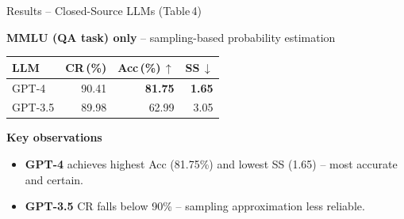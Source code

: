 \documentclass{beamer}
\newcommand{\hrow}{\rowcolor{hlblue}}
\begin{document}
\begin{frame}{Results -- Closed-Source LLMs (Table\,4)}

\begin{block}{\textbf{MMLU (QA task) only} \small-- sampling-based probability estimation}
\small
\renewcommand{\arraystretch}{1.4}
\begin{center}
\begin{tabular}{lrrr}
\toprule
\textbf{LLM} & \textbf{CR\,(\%)} & \textbf{Acc\,(\%)\,$\uparrow$} & \textbf{SS\,$\downarrow$} \\
\midrule
\hrow GPT-4              & 90.41 & \textbf{81.75} & \textbf{1.65} \\
GPT-3.5                  & 89.98 & 62.99 & 3.05 \\
\bottomrule
\end{tabular}
\end{center}
\end{block}

\medskip

\begin{block}{\textbf{Key observations}}
\small
\begin{itemize}\setlength\itemsep{2pt}
  \item \textbf{GPT-4} achieves highest Acc (81.75\%) and lowest SS (1.65) -- most accurate and certain.
  \item \textbf{GPT-3.5} CR falls below 90\% -- sampling approximation less reliable.
\end{itemize}
\end{block}

\end{frame}
\end{document}
